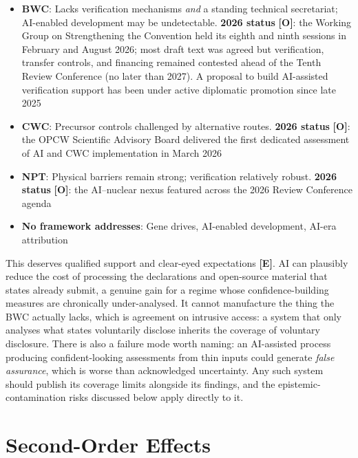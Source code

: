 \documentclass[11pt,letterpaper]{article}
\begin{document}
\begin{itemize}
  \item \textbf{BWC}: Lacks verification mechanisms \textit{and} a standing technical secretariat; AI-enabled development may be undetectable. \textbf{2026 status} \textbf{[O]}: the Working Group on Strengthening the Convention held its eighth and ninth sessions in February and August 2026; most draft text was agreed but verification, transfer controls, and financing remained contested ahead of the Tenth Review Conference (no later than 2027). A proposal to build AI-assisted verification support has been under active diplomatic promotion since late 2025
  \item \textbf{CWC}: Precursor controls challenged by alternative routes. \textbf{2026 status} \textbf{[O]}: the OPCW Scientific Advisory Board delivered the first dedicated assessment of AI and CWC implementation in March 2026
  \item \textbf{NPT}: Physical barriers remain strong; verification relatively robust. \textbf{2026 status} \textbf{[O]}: the AI--nuclear nexus featured across the 2026 Review Conference agenda
  \item \textbf{No framework addresses}: Gene drives, AI-enabled development, AI-era attribution
\end{itemize}

\begin{barrierbox}
This deserves qualified support and clear-eyed expectations \textbf{[E]}. AI can plausibly reduce the cost of processing the declarations and open-source material that states already submit, a genuine gain for a regime whose confidence-building measures are chronically under-analysed. It cannot manufacture the thing the BWC actually lacks, which is agreement on intrusive access: a system that only analyses what states voluntarily disclose inherits the coverage of voluntary disclosure. There is also a failure mode worth naming: an AI-assisted process producing confident-looking assessments from thin inputs could generate \textit{false assurance}, which is worse than acknowledged uncertainty. Any such system should publish its coverage limits alongside its findings, and the epistemic-contamination risks discussed below apply directly to it.
\end{barrierbox}

\section{Second-Order Effects}
\end{document}
